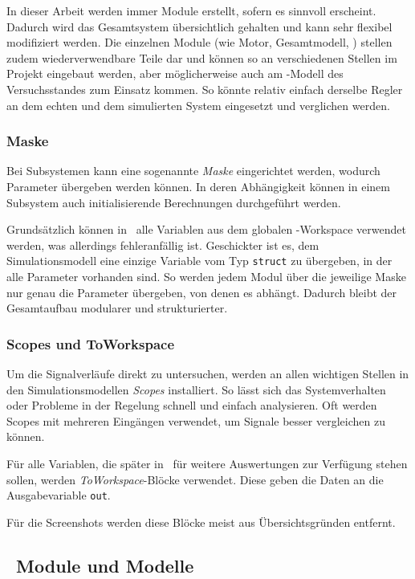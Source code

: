 In dieser Arbeit werden immer Module erstellt, sofern es sinnvoll erscheint.
Dadurch wird das Gesamtsystem übersichtlich gehalten und kann sehr flexibel modifiziert werden.
Die einzelnen Module (wie \zB Motor, Gesamtmodell, \zsr) stellen zudem wiederverwendbare Teile dar und können so an verschiedenen Stellen im Projekt eingebaut werden, aber möglicherweise auch am \sm-Modell des Versuchsstandes zum Einsatz kommen.
So könnte relativ einfach derselbe Regler an dem echten und dem simulierten System eingesetzt und verglichen werden.

\subsubsection{Maske}
Bei Subsystemen kann eine sogenannte \emph{Maske} eingerichtet werden, wodurch Parameter übergeben werden können.
In deren Abhängigkeit können in einem Subsystem auch initialisierende Berechnungen durchgeführt werden.

Grundsätzlich können in \sm\ alle Variablen aus dem globalen \ml-Workspace verwendet werden, was allerdings fehleranfällig ist.
Geschickter ist es, dem Simulationsmodell eine einzige Variable vom Typ \texttt{struct} zu übergeben, in der alle Parameter vorhanden sind.
So werden jedem Modul über die jeweilige Maske nur genau die Parameter übergeben, von denen es abhängt.
Dadurch bleibt der Gesamtaufbau modularer und strukturierter.

\subsubsection{Scopes und ToWorkspace}
Um die Signalverläufe direkt zu untersuchen, werden an allen wichtigen Stellen in den Simulationsmodellen \emph{Scopes} installiert.
So lässt sich das Systemverhalten oder Probleme in der Regelung schnell und einfach analysieren.
Oft werden Scopes mit mehreren Eingängen verwendet, um Signale besser vergleichen zu können.

Für alle Variablen, die später in \ml\ für weitere Auswertungen zur Verfügung stehen sollen, werden \emph{ToWorkspace}-Blöcke verwendet.
Diese geben die Daten an die Ausgabevariable \texttt{out}.

Für die Screenshots werden diese Blöcke meist aus Übersichtsgründen entfernt.


\subsection{\Simulink\ Module und Modelle}


